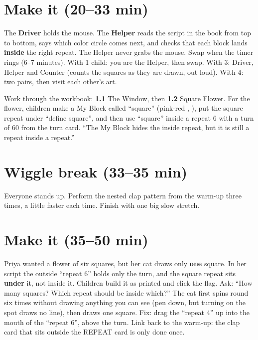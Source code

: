 \section{Make it (20--33 min)}
\begin{pairroles}
The \textbf{Driver} holds the mouse. The \textbf{Helper} reads the script in the book from top to bottom, says which color circle comes next, and checks that each block lands \textbf{inside} the right repeat. The Helper never grabs the mouse. Swap when the timer rings (6--7 minutes). With 1 child: you are the Helper, then swap. With 3: Driver, Helper and Counter (counts the squares as they are drawn, out loud). With 4: two pairs, then visit each other's art.
\end{pairroles}

Work through the workbook: \textbf{1.1} The Window, then \textbf{1.2} Square Flower. For the flower, children make a My Block called \enquote{square} (pink-red , ), put the square repeat under \enquote{define square}, and then use \enquote{square} inside a repeat 6 with a turn of 60 from the turn card. \enquote{The My Block hides the inside repeat, but it is still a repeat inside a repeat.}

\section{Wiggle break (33--35 min)}
Everyone stands up. Perform the nested clap pattern from the warm-up three times, a little faster each time. Finish with one big slow stretch.

\section{Make it (35--50 min)}
\begin{bughunt}
Priya wanted a flower of six squares, but her cat draws only \textbf{one} square. In her script the outside \enquote{repeat 6} holds only the turn, and the square repeat sits \textbf{under} it, not inside it. Children build it as printed and click the flag. Ask: \enquote{How many squares? Which repeat should be inside which?} The cat first spins round six times without drawing anything you can see (pen down, but turning on the spot draws no line), then draws one square. Fix: drag the \enquote{repeat 4} up into the mouth of the \enquote{repeat 6}, above the turn. Link back to the warm-up: the clap card that sits outside the REPEAT card is only done once.
\end{bughunt}

